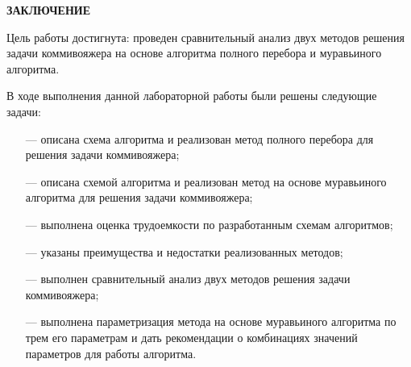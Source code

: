 \begin{center}
    \textbf{ЗАКЛЮЧЕНИЕ}
\end{center}

Цель работы достигнута: проведен сравнительный анализ двух методов решения задачи коммивояжера на основе алгоритма полного перебора и муравьиного алгоритма.

\vspace{5mm}

В ходе выполнения данной лабораторной работы были решены следующие задачи:
\begin{itemize}
	\item[---] описана схема алгоритма и реализован метод полного перебора для решения задачи коммивояжера;
	\item[---] описана схемой алгоритма и реализован метод на основе муравьиного алгоритма для решения задачи коммивояжера;
    \item[---] выполнена оценка трудоемкости по разработанным схемам алгоритмов;
    \item[---] указаны преимущества и недостатки реализованных методов;
    \item[---] выполнен сравнительный анализ двух методов решения задачи коммивояжера;
    \item[---] выполнена параметризация метода на основе муравьиного алгоритма по трем его параметрам и дать рекомендации о комбинациях значений параметров для работы алгоритма.
\end{itemize}